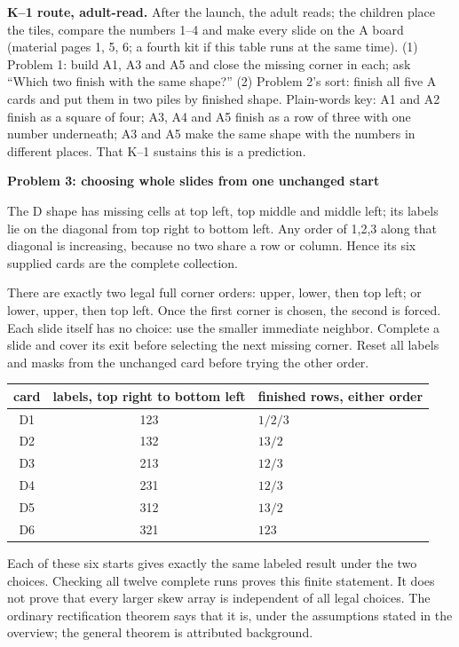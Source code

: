 \documentclass[11pt]{article}
\newcommand{\heading}[1]{\par\textbf{#1}\par}
\begin{document}
\textbf{K--1 route, adult-read.} After the launch, the adult reads; the children place the tiles, compare the numbers 1--4 and make every slide on the A board (material pages 1, 5, 6; a fourth kit if this table runs at the same time). (1) Problem 1: build A1, A3 and A5 and close the missing corner in each; ask ``Which two finish with the same shape?'' (2) Problem 2's sort: finish all five A cards and put them in two piles by finished shape. Plain-words key: A1 and A2 finish as a square of four; A3, A4 and A5 finish as a row of three with one number underneath; A3 and A5 make the same shape with the numbers in different places. That K--1 sustains this is a prediction.
\newpage
\heading{Problem 3: choosing whole slides from one unchanged start}
The D shape has missing cells at top left, top middle and middle left; its labels lie on the diagonal from top right to bottom left. Any order of 1,2,3 along that diagonal is increasing, because no two share a row or column. Hence its six supplied cards are the complete collection.

There are exactly two legal full corner orders: upper, lower, then top left; or lower, upper, then top left. Once the first corner is chosen, the second is forced. Each slide itself has no choice: use the smaller immediate neighbor. Complete a slide and cover its exit before selecting the next missing corner. Reset all labels and masks from the unchanged card before trying the other order.

\begin{center}\begin{tabular}{ccl}\toprule
card&labels, top right to bottom left&finished rows, either order\\\midrule
D1&123&$1/2/3$\\
D2&132&$13/2$\\
D3&213&$12/3$\\
D4&231&$12/3$\\
D5&312&$13/2$\\
D6&321&$123$\\\bottomrule
\end{tabular}\end{center}
Each of these six starts gives exactly the same labeled result under the two choices. Checking all twelve complete runs proves this finite statement. It does not prove that every larger skew array is independent of all legal choices. The ordinary rectification theorem says that it is, under the assumptions stated in the overview; the general theorem is attributed background.
\end{document}
